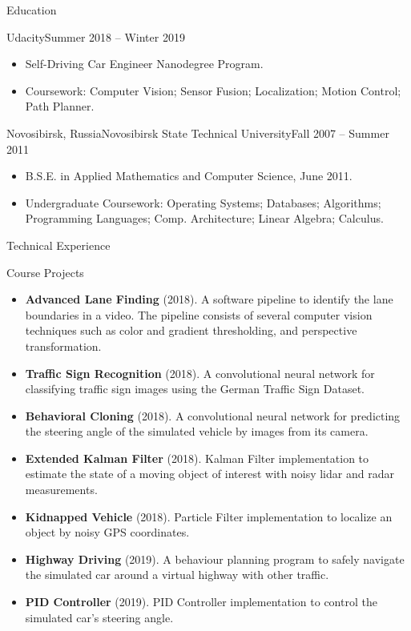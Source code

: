 \documentclass[]{cv}
\begin{document}
	\begin{cvsection}{Education}
    \begin{cvsubsection}{Udacity}{}{Summer 2018 -- Winter 2019}
			\begin{itemize}
				\item Self-Driving Car Engineer Nanodegree Program.
				\item Coursework: Computer Vision; Sensor Fusion; Localization; Motion Control; Path Planner.
			\end{itemize}
		\end{cvsubsection}
		\begin{cvsubsection}{Novosibirsk, Russia}{Novosibirsk State Technical University}{Fall 2007 -- Summer 2011}
			\begin{itemize}
				\item B.S.E. in Applied Mathematics and Computer Science, June 2011.
				\item Undergraduate Coursework: Operating Systems; Databases; Algorithms; Programming Languages; Comp. Architecture; Linear Algebra; Calculus.
			\end{itemize}
		\end{cvsubsection}
	\end{cvsection}

	\begin{cvsection}{Technical Experience}
		\begin{cvsubsection}{Course Projects}{}{}
			\begin{itemize}
				\item \textbf{Advanced Lane Finding} (2018). A software pipeline to identify the lane boundaries in a video. The pipeline consists of several computer vision techniques such as color and gradient thresholding, and perspective transformation.
				\item \textbf{Traffic Sign Recognition} (2018). A convolutional neural network for classifying traffic sign images using the German Traffic Sign Dataset.
				\item \textbf{Behavioral Cloning} (2018). A convolutional neural network for predicting the steering angle of the simulated vehicle by images from its camera.
				\item \textbf{Extended Kalman Filter} (2018). Kalman Filter implementation to estimate the state of a moving object of interest with noisy lidar and radar measurements.
				\item \textbf{Kidnapped Vehicle} (2018). Particle Filter implementation to localize an object by noisy GPS coordinates.
				\item \textbf{Highway Driving} (2019). A behaviour planning program to safely navigate the simulated car around a virtual highway with other traffic.
				\item \textbf{PID Controller} (2019). PID Controller implementation to control the simulated car's steering angle.
			\end{itemize}
		\end{cvsubsection}
	\end{cvsection}
\end{document}
